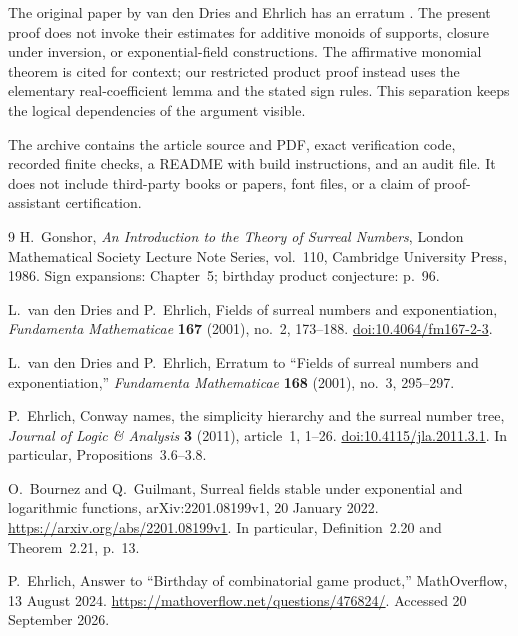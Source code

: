 \documentclass[11pt,letterpaper]{article}
\numberwithin{equation}{section}
\theoremstyle{definition}
\theoremstyle{remark}
\begin{document}
The original paper by van den Dries and Ehrlich has an erratum
\cite{vdDEErratum}. The present proof does not invoke their estimates for
additive monoids of supports, closure under inversion, or exponential-field
constructions. The affirmative monomial theorem is cited for context; our
restricted product proof instead uses the elementary real-coefficient lemma
and the stated sign rules. This separation keeps the logical dependencies of
the argument visible.

The archive contains the article source and PDF, exact verification code,
recorded finite checks, a README with build instructions, and an audit file.
It does not include third-party books or papers, font files, or a claim of
proof-assistant certification.

\clearpage
\begin{thebibliography}{9}
H.~Gonshor,
\emph{An Introduction to the Theory of Surreal Numbers},
London Mathematical Society Lecture Note Series, vol.~110,
Cambridge University Press, 1986.
Sign expansions: Chapter~5; birthday product conjecture: p.~96.

L.~van den Dries and P.~Ehrlich,
Fields of surreal numbers and exponentiation,
\emph{Fundamenta Mathematicae} \textbf{167} (2001), no.~2, 173--188.
\href{https://doi.org/10.4064/fm167-2-3}{doi:10.4064/fm167-2-3}.

L.~van den Dries and P.~Ehrlich,
Erratum to ``Fields of surreal numbers and exponentiation,''
\emph{Fundamenta Mathematicae} \textbf{168} (2001), no.~3, 295--297.

P.~Ehrlich,
Conway names, the simplicity hierarchy and the surreal number tree,
\emph{Journal of Logic \& Analysis} \textbf{3} (2011), article~1, 1--26.
\href{https://doi.org/10.4115/jla.2011.3.1}{doi:10.4115/jla.2011.3.1}.
In particular, Propositions~3.6--3.8.

O.~Bournez and Q.~Guilmant,
Surreal fields stable under exponential and logarithmic functions,
arXiv:2201.08199v1, 20 January 2022.
\url{https://arxiv.org/abs/2201.08199v1}.
In particular, Definition~2.20 and Theorem~2.21, p.~13.

P.~Ehrlich,
Answer to ``Birthday of combinatorial game product,''
MathOverflow, 13 August 2024.
\url{https://mathoverflow.net/questions/476824/}.
Accessed 20 September 2026.
\end{thebibliography}
\end{document}
